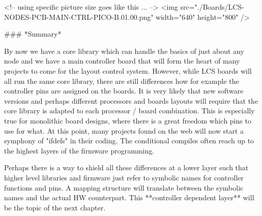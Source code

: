 <!-- using specific picture size goes like this ... -->
<img src="./Boards/LCS-NODES-PCB-MAIN-CTRL-PICO-B.01.00.png" width="640" height="800" />


### *Summary*

By now we have a core library which can handle the basics of just about any node and we have a main controller board that will form the heart of many projects to come for the layout control system. However, while LCS boards will all run the same core library, there are still differences how for example the controller pins are assigned on the boards. It is very likely that new software versions and perhaps different processors and boards layouts will require that the core library is adapted to each processor / board combination. This is especially true for monolithic board designs, where there is a great freedom which pins to use for what. At this point, many projects found on the web will now start a symphony of "ifdefs" in their coding. The conditional compiles often reach up to the highest layers of the firmware programming. 

Perhaps there is a way to shield all these differences at a lower layer such that higher level libraries and firmware just refer to symbolic names for controller functions and pins. A mapping structure will translate between the symbolic names and the actual HW counterpart. This **controller dependent layer** will be the topic of the next chapter.
